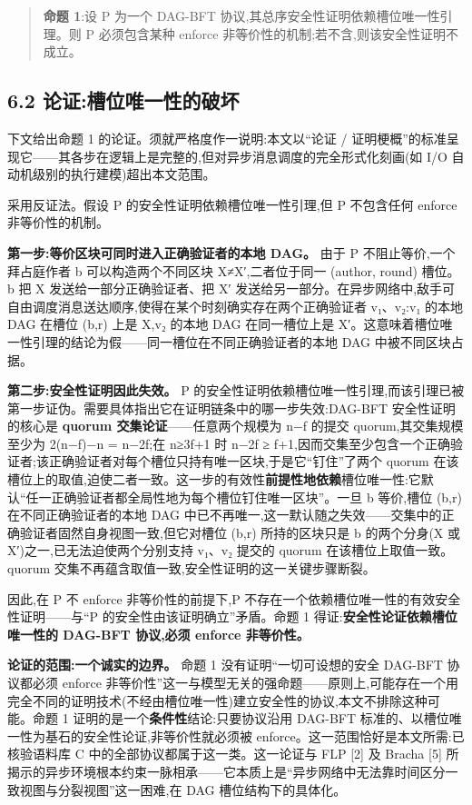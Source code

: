 \documentclass[UTF8,fontset=windows,a4paper,11pt]{ctexart}
\begin{document}
\begin{quote}
\textbf{命题 1}:设 P 为一个 DAG-BFT
协议,其总序安全性证明依赖槽位唯一性引理。则 P 必须包含某种 enforce
非等价性的机制;若不含,则该安全性证明不成立。
\end{quote}

\subsection{6.2
论证:槽位唯一性的破坏}\label{ux8bbaux8bc1ux69fdux4f4dux552fux4e00ux6027ux7684ux7834ux574f}

下文给出命题 1 的论证。须就严格度作一说明:本文以``论证 /
证明梗概''的标准呈现它------其各步在逻辑上是完整的,但对异步消息调度的完全形式化刻画(如
I/O 自动机级别的执行建模)超出本文范围。

采用反证法。假设 P 的安全性证明依赖槽位唯一性引理,但 P 不包含任何
enforce 非等价性的机制。

\textbf{第一步:等价区块可同时进入正确验证者的本地 DAG。} 由于 P
不阻止等价,一个拜占庭作者 b 可以构造两个不同区块 X≠X′,二者位于同一
(author, round) 槽位。b 把 X 发送给一部分正确验证者、把 X′
发送给另一部分。在异步网络中,敌手可自由调度消息送达顺序,使得在某个时刻确实存在两个正确验证者
v₁、v₂:v₁ 的本地 DAG 在槽位 (b,r) 上是 X,v₂ 的本地 DAG 在同一槽位上是
X′。这意味着槽位唯一性引理的结论为假------同一槽位在不同正确验证者的本地
DAG 中被不同区块占据。

\textbf{第二步:安全性证明因此失效。} P
的安全性证明依赖槽位唯一性引理,而该引理已被第一步证伪。需要具体指出它在证明链条中的哪一步失效:DAG-BFT
安全性证明的核心是 \textbf{quorum 交集论证}------任意两个规模为 n−f
的提交 quorum,其交集规模至少为 2(n−f)−n = n−2f;在 n≥3f+1 时 n−2f ≥
f+1,因而交集至少包含一个正确验证者;该正确验证者对每个槽位只持有唯一区块,于是它``钉住''了两个
quorum
在该槽位上的取值,迫使二者一致。这一步的有效性\textbf{前提性地依赖}槽位唯一性:它默认``任一正确验证者都全局性地为每个槽位钉住唯一区块''。一旦
b 等价,槽位 (b,r) 在不同正确验证者的本地 DAG
中已不再唯一,这一默认随之失效------交集中的正确验证者固然自身视图一致,但它对槽位
(b,r) 所持的区块只是 b 的两个分身(X 或 X′)之一,已无法迫使两个分别支持
v₁、v₂ 提交的 quorum 在该槽位上取值一致。quorum
交集不再蕴含取值一致,安全性证明的这一关键步骤断裂。

因此,在 P 不 enforce 非等价性的前提下,P
不存在一个依赖槽位唯一性的有效安全性证明------与``P
的安全性由该证明确立''矛盾。命题 1
得证:\textbf{安全性论证依赖槽位唯一性的 DAG-BFT 协议,必须 enforce
非等价性。}

\textbf{论证的范围:一个诚实的边界。} 命题 1 没有证明``一切可设想的安全
DAG-BFT 协议都必须 enforce
非等价性''这一与模型无关的强命题------原则上,可能存在一个用完全不同的证明技术(不经由槽位唯一性)建立安全性的协议,本文不排除这种可能。命题
1 证明的是一个\textbf{条件性}结论:只要协议沿用 DAG-BFT
标准的、以槽位唯一性为基石的安全性论证,非等价性就必须被
enforce。这一范围恰好是本文所需:已核验语料库 C
中的全部协议都属于这一类。这一论证与 FLP {[}2{]} 及 Bracha {[}5{]}
所揭示的异步环境根本约束一脉相承------它本质上是``异步网络中无法靠时间区分一致视图与分裂视图''这一困难,在
DAG 槽位结构下的具体化。
\end{document}
